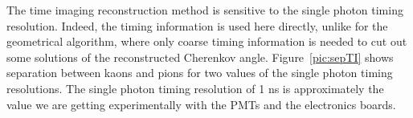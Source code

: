 
The time imaging reconstruction method is sensitive to the single photon timing resolution. Indeed, the timing information is used here directly, unlike for the geometrical algorithm, where only coarse timing information is needed to cut out some solutions of the reconstructed Cherenkov angle. Figure~\ref{pic:sepTI} shows separation between kaons and pions for two values of the single photon timing resolutions. The single photon timing resolution of 1 ns is approximately the value we are getting experimentally with the PMTs and the electronics boards.


